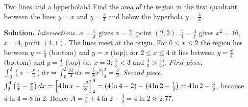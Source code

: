 \documentclass[11pt]{article}
\begin{document}
\begin{exmp}{Two lines and a hyperbola}{b5}
Find the area of the region in the first quadrant between the lines $y=x$ and $y=\frac x4$ and below the hyperbola $y=\frac4x$.

\textbf{Solution.} \emph{Intersections.} $x=\frac4x$ gives $x=2$, point $(2,2)$. $\frac x4=\frac4x$ gives $x^2=16$, $x=4$, point $(4,1)$. The lines meet at the origin. For $0\le x\le2$ the region lies between $y=\frac x4$ (bottom) and $y=x$ (top); for $2\le x\le4$ it lies between $y=\frac x4$ (bottom) and $y=\frac4x$ (top) (at $x=3$: $\frac43<3$ and $\frac43>\frac34$).
\emph{First piece.} $\int_0^2\left(x-\frac x4\right)dx=\int_0^2\frac{3x}4\,dx=\frac38x^2\Big|_0^2=\frac32$.
\emph{Second piece.} $\int_2^4\left(\frac4x-\frac x4\right)dx=\Bigl[4\ln x-\frac{x^2}8\Bigr]_2^4=\left(4\ln4-2\right)-\left(4\ln2-\frac12\right)=4\ln2-\frac32$, because $4\ln4=8\ln2$.
Hence $A=\frac32+4\ln2-\frac32=4\ln2\approx2.77$.
\end{exmp}
\end{document}
